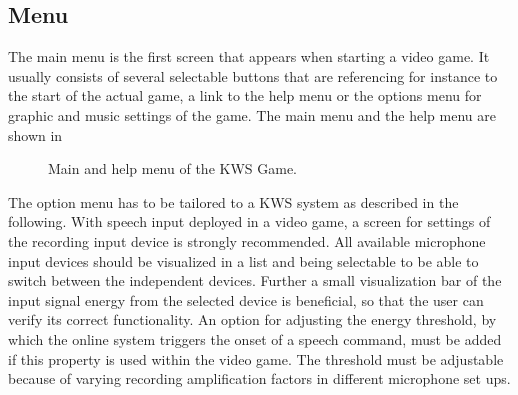 \subsection{Menu}\label{sec:game_design_menu}
The main menu is the first screen that appears when starting a video game. 
It usually consists of several selectable buttons that are referencing for instance to the start of the actual game, a link to the help menu or the options menu for graphic and music settings of the game.
The main menu and the help menu are shown in 
\begin{figure}[!ht]
  \centering
  \qquad
  \caption{Main and help menu of the KWS Game.}
  \label{fig:game_design_menu_mainhelp}
\end{figure}
\FloatBarrier
\noindent
The option menu has to be tailored to a KWS system as described in the following.
With speech input deployed in a video game, a screen for settings of the recording input device is strongly recommended.
All available microphone input devices should be visualized in a list and being selectable to be able to switch between the independent devices.
Further a small visualization bar of the input signal energy from the selected device is beneficial, so that the user can verify its correct functionality.
An option for adjusting the energy threshold, by which the online system triggers the onset of a speech command, must be added if this property is used within the video game.
The threshold must be adjustable because of varying recording amplification factors in different microphone set ups.
